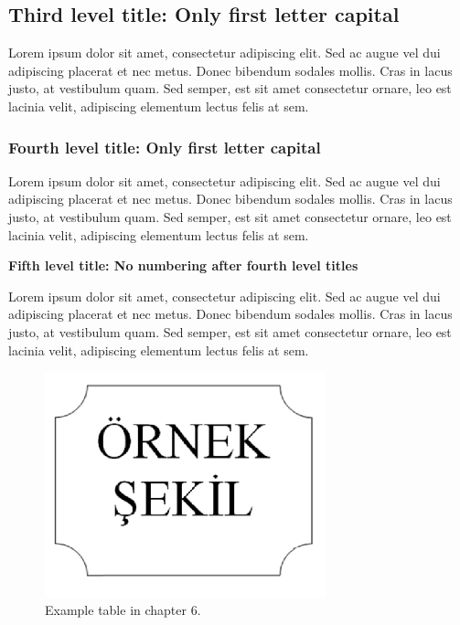 \subsection{Third level title: Only first letter capital}

Lorem ipsum dolor sit amet, consectetur adipiscing elit. Sed ac augue vel dui 
adipiscing placerat et nec metus. Donec bibendum sodales mollis. Cras in lacus 
justo, at vestibulum quam. Sed semper, est sit amet consectetur ornare, leo est 
lacinia velit, adipiscing elementum lectus felis at sem.

\subsubsection{Fourth level title: Only first letter capital}

Lorem ipsum dolor sit amet, consectetur adipiscing elit. Sed ac augue vel dui 
adipiscing placerat et nec metus. Donec bibendum sodales mollis. Cras in lacus 
justo, at vestibulum quam. Sed semper, est sit amet consectetur ornare, leo est 
lacinia velit, adipiscing elementum lectus felis at sem.

{\bf Fifth level title: No numbering
after fourth level titles}

Lorem ipsum dolor sit amet, consectetur adipiscing elit. Sed ac augue vel dui 
adipiscing placerat et nec metus. Donec bibendum sodales mollis. Cras in lacus 
justo, at vestibulum quam. Sed semper, est sit amet consectetur ornare, leo est 
lacinia velit, adipiscing elementum lectus felis at sem.

\begin{figure}
 \centering
 \includegraphics[width=230pt,keepaspectratio=true]{./fig/sekil7}
 \caption{Example table in chapter 6.}
 \label{fig:6-1}
\end{figure}

